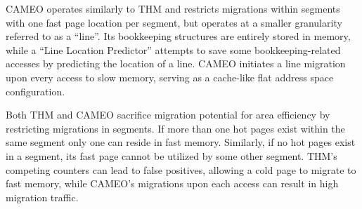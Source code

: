 CAMEO \cite{cameo} operates similarly to THM and restricts migrations within segments with one fast page location per segment, but operates at a smaller granularity referred to as a ``line''. Its bookkeeping structures are entirely stored in memory, while a ``Line Location Predictor'' attempts to save some bookkeeping-related accesses by predicting the location of a line. CAMEO initiates a line migration upon every access to slow memory, serving as a cache-like flat address space configuration.

Both THM and CAMEO sacrifice migration potential for area efficiency by restricting migrations in segments. If more than one hot pages exist within the same segment only one can reside in fast memory. Similarly, if no hot pages exist in a segment, its fast page cannot be utilized by some other segment. THM's competing counters can lead to false positives, allowing a cold page to migrate to fast memory, while CAMEO's migrations upon each access can result in high migration traffic.